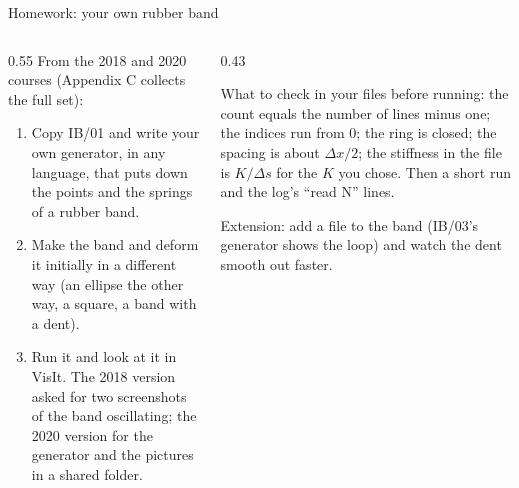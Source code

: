 \documentclass[aspectratio=169,11pt]{beamer}
\begin{document}
\begin{frame}{Homework: your own rubber band}
\begin{columns}[T,onlytextwidth]
\begin{column}{0.55\textwidth}
From the 2018 and 2020 courses (Appendix C collects the full set):
\begin{enumerate}
  \item Copy IB/01 and write your own generator, in any language, that puts down the  points and the  springs of a rubber band.
  \item Make the band  and deform it initially in a different way (an ellipse the other way, a square, a band with a dent).
  \item Run it and look at it in VisIt. The 2018 version asked for two screenshots of the band oscillating; the 2020 version for the generator and the pictures in a shared folder.
\end{enumerate}
\end{column}
\begin{column}{0.43\textwidth}
\begin{punchbox}
\small What to check in your files before running: the count equals the number of lines minus one; the indices run from 0; the ring is closed; the spacing is about $\Delta x/2$; the stiffness in the file is $K/\Delta s$ for the $K$ you chose. Then a short run and the log's ``read N'' lines.
\end{punchbox}
\vspace{2mm}
\small Extension: add a  file to the band (IB/03's generator shows the loop) and watch the dent smooth out faster.
\end{column}
\end{columns}
\end{frame}
\end{document}
